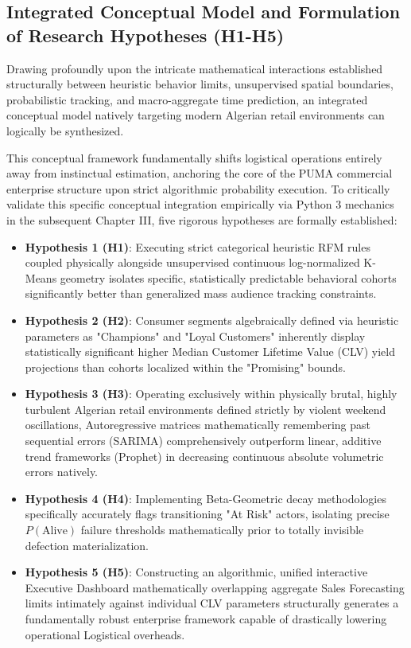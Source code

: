 \documentclass[12pt,a4paper]{report}
\begin{document}
\subsection{Integrated Conceptual Model and Formulation of Research Hypotheses (H1-H5)}
Drawing profoundly upon the intricate mathematical interactions established structurally between heuristic behavior limits, unsupervised spatial boundaries, probabilistic tracking, and macro-aggregate time prediction, an integrated conceptual model natively targeting modern Algerian retail environments can logically be synthesized.

This conceptual framework fundamentally shifts logistical operations entirely away from instinctual estimation, anchoring the core of the PUMA commercial enterprise structure upon strict algorithmic probability execution. To critically validate this specific conceptual integration empirically via Python 3 mechanics in the subsequent Chapter III, five rigorous hypotheses are formally established:

\begin{itemize}
    \item \textbf{Hypothesis 1 (H1)}: Executing strict categorical heuristic RFM rules coupled physically alongside unsupervised continuous log-normalized K-Means geometry isolates specific, statistically predictable behavioral cohorts significantly better than generalized mass audience tracking constraints.
    \item \textbf{Hypothesis 2 (H2)}: Consumer segments algebraically defined via heuristic parameters as "Champions" and "Loyal Customers" inherently display statistically significant higher Median Customer Lifetime Value (CLV) yield projections than cohorts localized within the "Promising" bounds.
    \item \textbf{Hypothesis 3 (H3)}: Operating exclusively within physically brutal, highly turbulent Algerian retail environments defined strictly by violent weekend oscillations, Autoregressive matrices mathematically remembering past sequential errors (SARIMA) comprehensively outperform linear, additive trend frameworks (Prophet) in decreasing continuous absolute volumetric errors natively.
    \item \textbf{Hypothesis 4 (H4)}: Implementing Beta-Geometric decay methodologies specifically accurately flags transitioning "At Risk" actors, isolating precise $P(\text{Alive})$ failure thresholds mathematically prior to totally invisible defection materialization.
    \item \textbf{Hypothesis 5 (H5)}: Constructing an algorithmic, unified interactive Executive Dashboard mathematically overlapping aggregate Sales Forecasting limits intimately against individual CLV parameters structurally generates a fundamentally robust enterprise framework capable of drastically lowering operational Logistical overheads.
\end{itemize}
\end{document}
